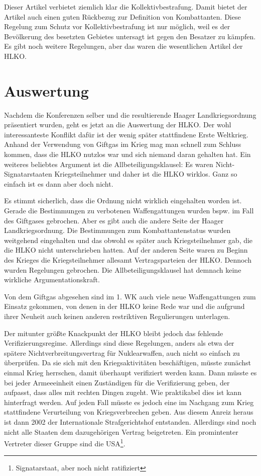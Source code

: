\documentclass[12pt]{scrartcl}
\begin{document}
Dieser Artikel verbietet ziemlich klar die Kollektivbestrafung. Damit bietet der Artikel auch einen guten Rückbezug zur Definition von Kombattanten. Diese Regelung zum Schutz vor Kollektivbestrafung ist nur möglich, weil es der Bevölkerung des besetzten Gebietes untersagt ist gegen den Besatzer zu kämpfen. Es gibt noch weitere Regelungen, aber das waren die wesentlichen Artikel der HLKO.

\section{Auswertung}
Nachdem die Konferenzen selber und die resultierende Haager Landkriegsordnung präsentiert wurden, geht es jetzt an die Auswertung der HLKO. Der wohl interessanteste Konflikt dafür ist der wenig später stattfindene Erste Weltkrieg. Anhand der Verwendung von Giftgas im Krieg mag man schnell zum Schluss kommen, dass die HLKO nutzlos war und sich niemand daran gehalten hat. Ein weiteres beliebtes Argument ist die Allbeteiligungsklausel: Es waren Nicht-Signatarstaaten Kriegsteilnehmer und daher ist die HLKO wirklos. Ganz so einfach ist es dann aber doch nicht.

Es stimmt sicherlich, dass die Ordnung nicht wirklich eingehalten worden ist. Gerade die Bestimmungen zu verbotenen Waffengattungen wurden bspw. im Fall des Giftgases gebrochen. Aber es gibt auch die andere Seite der Haager Landkriegsordnung. Die Bestimmungen zum Kombattantenstatus wurden weitgehend eingehalten\cite{Buss1992} und das obwohl es später auch Kriegsteilnehmer gab, die die HLKO nicht unterschrieben hatten. Auf der anderen Seite waren zu Beginn des Krieges die Kriegsteilnehmer allesamt Vertragsparteien der HLKO\cite{Buss1992}. Dennoch wurden Regelungen gebrochen. Die Allbeteiligungsklausel hat demnach keine wirkliche Argumentationskraft.

Von dem Giftgas abgesehen sind im 1. WK auch viele neue Waffengattungen zum Einsatz gekommen, von denen in der HLKO keine Rede war und die aufgrund ihrer Neuheit auch keinen anderen restriktiven Regulierungen unterlagen. 

Der mitunter größte Knackpunkt der HLKO bleibt jedoch das fehlende Verifizierungsregime. Allerdings sind diese Regelungen, anders als etwa der spätere Nichtverbreitungsvertrag für Nuklearwaffen, auch nicht so einfach zu überprüfen. Da sie sich mit den Kriegsaktivitäten beschäftigen, müsste zunächst einmal Krieg herrschen, damit überhaupt verifiziert werden kann. Dann müsste es bei jeder Armeeeinheit einen Zuständigen für die Verifizierung geben, der aufpasst, dass alles mit rechten Dingen zugeht. Wie praktikabel dies ist kann hinterfragt werden. Auf jeden Fall müsste es jedoch eine im Nachgang zum Krieg stattfindene Verurteilung von Kriegsverbrechen geben. Aus diesem Anreiz heraus ist dann 2002 der Internationale Strafgerichtshof entstanden. Allerdings sind noch nicht alle Staaten dem dazugehörigen Vertrag beigetreten. Ein promintenter Vertreter dieser Gruppe sind die USA\footnote{Signatarstaat, aber noch nicht ratifiziert}.
\end{document}
